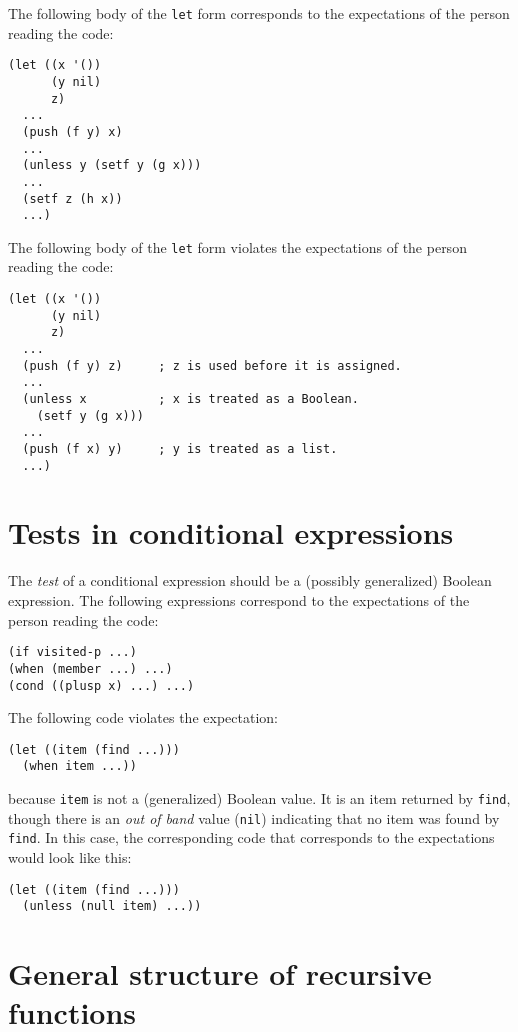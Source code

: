 The following body of the \texttt{let} form corresponds to the
expectations of the person reading the code:

\begin{verbatim}
(let ((x '())
      (y nil)
      z)
  ...
  (push (f y) x)
  ...
  (unless y (setf y (g x)))
  ...
  (setf z (h x))
  ...)
\end{verbatim}

The following body of the \texttt{let} form violates the expectations
of the person reading the code:

\begin{verbatim}
(let ((x '())
      (y nil)
      z)
  ...
  (push (f y) z)     ; z is used before it is assigned.
  ...
  (unless x          ; x is treated as a Boolean.
    (setf y (g x)))
  ...
  (push (f x) y)     ; y is treated as a list.
  ...)
\end{verbatim}

\section{Tests in conditional expressions}

The \emph{test} of a conditional expression should be a (possibly
generalized) Boolean expression.  The following expressions correspond
to the expectations of the person reading the code:

\begin{verbatim}
(if visited-p ...)
(when (member ...) ...)
(cond ((plusp x) ...) ...)
\end{verbatim}

The following code violates the expectation:

\begin{verbatim}
(let ((item (find ...)))
  (when item ...))
\end{verbatim}

because \texttt{item} is not a (generalized) Boolean value.  It is an
item returned by \texttt{find}, though there is an \emph{out of band}
value (\texttt{nil}) indicating that no item was found by
\texttt{find}.  In this case, the corresponding code that corresponds
to the expectations would look like this:

\begin{verbatim}
(let ((item (find ...)))
  (unless (null item) ...))
\end{verbatim}

\section{General structure of recursive functions}

